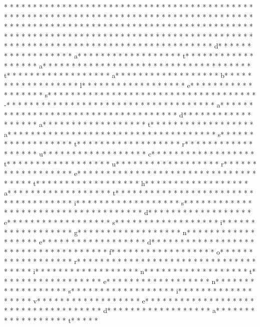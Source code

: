 * * *  * * *  * * *  *  * * *  *  * * *  * 	* * *  * * *  * * *  *  * * *  *  * * *  * 	* * *  * * *  * * *  *  * * *  *  * * *  * * *  * * *  *  * * *  *  * * *  * * *  * * *  *  * * *  *  * * *  *  * * *  * * *  * * *  *  * * *  *  * * *  *  * * *  * * *  * * *  *  * * *  *  * * *  *  * * *  * * *  * * *  *  * * *  *  * * *  *  * * *  * * *  * * *  *  * * *  *  * * *  *  * * *  * * *  * * *  *  * * *  *  * * *  *  * * *  * * *  * * *  *  * * *  *  * * *  *  * * *  * * *  * * *  *  * * *  *  * * *  * d* * *  * * *  * * *  *  * * *  *  * * *  * a* * *  * * *  * * *  *  * * *  *  * * *  * t* * *  * * *  * * *  *  * * *  *  * * *  * a* * *  * * *  * * *  *  * * *  *  * * *  *  * * *  * * *  * * *  *  * * *  *  * * *  * t* * *  * * *  * * *  *  * * *  *  * * *  * a* * *  * * *  * * *  *  * * *  *  * * *  * b* * *  * * *  * * *  *  * * *  *  * * *  * l* * *  * * *  * * *  *  * * *  *  * * *  * e* * *  * * *  * * *  *  * * *  *  * * *  * s* * *  * * *  * * *  *  * * *  *  * * *  *  * * *  * * *  * * *  *  * * *  *  * * *  * -* * *  * * *  * * *  *  * * *  *  * * *  *  * * *  * * *  * * *  *  * * *  *  * * *  * a* * *  * * *  * * *  *  * * *  *  * * *  *  * * *  * * *  * * *  *  * * *  *  * * *  * d* * *  * * *  * * *  *  * * *  *  * * *  * a* * *  * * *  * * *  *  * * *  *  * * *  * t* * *  * * *  * * *  *  * * *  *  * * *  * a* * *  * * *  * * *  *  * * *  *  * * *  *  * * *  * * *  * * *  *  * * *  *  * * *  * s* * *  * * *  * * *  *  * * *  *  * * *  * t* * *  * * *  * * *  *  * * *  *  * * *  * r* * *  * * *  * * *  *  * * *  *  * * *  * u* * *  * * *  * * *  *  * * *  *  * * *  * c* * *  * * *  * * *  *  * * *  *  * * *  * t* * *  * * *  * * *  *  * * *  *  * * *  * u* * *  * * *  * * *  *  * * *  *  * * *  * r* * *  * * *  * * *  *  * * *  *  * * *  * e* * *  * * *  * * *  *  * * *  *  * * *  *  * * *  * * *  * * *  *  * * *  *  * * *  * t* * *  * * *  * * *  *  * * *  *  * * *  * h* * *  * * *  * * *  *  * * *  *  * * *  * a* * *  * * *  * * *  *  * * *  *  * * *  * t* * *  * * *  * * *  *  * * *  *  * * *  *  * * *  * * *  * * *  *  * * *  *  * * *  * i* * *  * * *  * * *  *  * * *  *  * * *  * s* * *  * * *  * * *  *  * * *  *  * * *  *  * * *  * * *  * * *  *  * * *  *  * * *  * d* * *  * * *  * * *  *  * * *  *  * * *  * e* * *  * * *  * * *  *  * * *  *  * * *  * s* * *  * * *  * * *  *  * * *  *  * * *  * i* * *  * * *  * * *  *  * * *  *  * * *  * g* * *  * * *  * * *  *  * * *  *  * * *  * n* * *  * * *  * * *  *  * * *  *  * * *  * e* * *  * * *  * * *  *  * * *  *  * * *  * d* * *  * * *  * * *  *  * * *  *  * * *  *  * * *  * * *  * * *  *  * * *  *  * * *  * f* * *  * * *  * * *  *  * * *  *  * * *  * o* * *  * * *  * * *  *  * * *  *  * * *  * r* * *  * * *  * * *  *  * * *  *  * * *  *  * * *  * * *  * * *  *  * * *  *  * * *  * i* * *  * * *  * * *  *  * * *  *  * * *  * n* * *  * * *  * * *  *  * * *  *  * * *  * t* * *  * * *  * * *  *  * * *  *  * * *  * e* * *  * * *  * * *  *  * * *  *  * * *  * n* * *  * * *  * * *  *  * * *  *  * * *  * s* * *  * * *  * * *  *  * * *  *  * * *  * i* * *  * * *  * * *  *  * * *  *  * * *  * v* * *  * * *  * * *  *  * * *  *  * * *  * e* * *  * * *  * * *  *  * * *  *  * * *  *  * * *  * * *  * * *  *  * * *  *  * * *  * d* * *  * * *  * * *  *  * * *  *  * * *  * a* * *  * * *  * * *  *  * * *  *  * * *  * t* * *  * * 